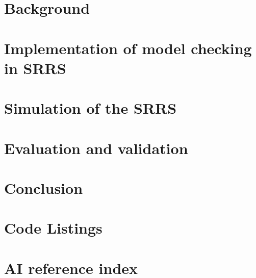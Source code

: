 \chapter{Background} \label{background}
\label{ch:background}

\newpage

\newpage

\newpage
\chapter{Implementation of model checking in SRRS}
\label{ch:implementation}




% 

\chapter{Simulation of the SRRS}
\label{ch:simulation}

\chapter{Evaluation and validation}
\label{ch:evaluation}

\chapter{Conclusion}


\printbibliography[heading=bibintoc]
\appendix
\chapter{Code Listings}


\chapter{AI reference index}

